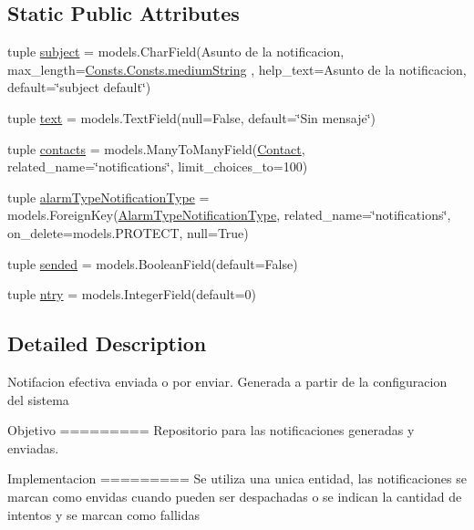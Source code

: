 \subsection*{Static Public Attributes}
\begin{DoxyCompactItemize}
\item 
tuple \hyperlink{class_ground_segment_1_1models_1_1_notification_1_1_notification_1_1_notification_a5d4145d0ba4943ac10e0a269ea3ae54e}{subject} = models.\+Char\+Field(\textquotesingle{}Asunto de la notificacion\textquotesingle{}, max\+\_\+length=\hyperlink{class_ground_segment_1_1models_1_1_consts_1_1_consts_af293fcd2dc1b82ccc52722f90ac343ca}{Consts.\+Consts.\+medium\+String} , help\+\_\+text=\textquotesingle{}Asunto de la notificacion\textquotesingle{}, default=\char`\"{}subject default\char`\"{})
\item 
tuple \hyperlink{class_ground_segment_1_1models_1_1_notification_1_1_notification_1_1_notification_aab87e972d1da9172d2e7cce622b8fce3}{text} = models.\+Text\+Field(null=False, default=\char`\"{}Sin mensaje\char`\"{})
\item 
tuple \hyperlink{class_ground_segment_1_1models_1_1_notification_1_1_notification_1_1_notification_a1c85d3bd1dfb69b866c0b0023dd8bc6f}{contacts} = models.\+Many\+To\+Many\+Field(\hyperlink{class_ground_segment_1_1models_1_1_notification_1_1_contact_1_1_contact}{Contact}, related\+\_\+name=\char`\"{}notifications\char`\"{}, limit\+\_\+choices\+\_\+to=100)
\item 
tuple \hyperlink{class_ground_segment_1_1models_1_1_notification_1_1_notification_1_1_notification_ad668e7d1e333d3c3d4114276108046d7}{alarm\+Type\+Notification\+Type} = models.\+Foreign\+Key(\hyperlink{class_ground_segment_1_1models_1_1_notification_1_1_alarm_type_notification_type_1_1_alarm_type_notification_type}{Alarm\+Type\+Notification\+Type}, related\+\_\+name=\char`\"{}notifications\char`\"{}, on\+\_\+delete=models.\+P\+R\+O\+T\+E\+C\+T, null=True)
\item 
tuple \hyperlink{class_ground_segment_1_1models_1_1_notification_1_1_notification_1_1_notification_aec220ade3819946a0fb450d03e5ef97c}{sended} = models.\+Boolean\+Field(default=False)
\item 
tuple \hyperlink{class_ground_segment_1_1models_1_1_notification_1_1_notification_1_1_notification_a12664635efcb42cc8aef3d64c43b24d9}{ntry} = models.\+Integer\+Field(default=0)
\end{DoxyCompactItemize}


\subsection{Detailed Description}
\begin{DoxyVerb}Notifacion efectiva enviada o por enviar. Generada a partir de la configuracion del sistema

Objetivo
=========
    Repositorio para las notificaciones generadas y enviadas.

 
Implementacion
=========
    Se utiliza una unica entidad, las notificaciones se marcan como envidas cuando pueden ser despachadas o se
    indican la cantidad de intentos y se marcan como fallidas
\end{DoxyVerb}
 

